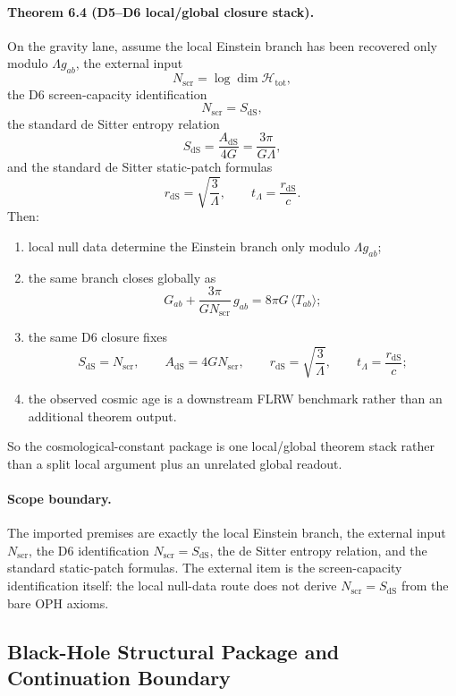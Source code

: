 \paragraph{\textbf{Theorem 6.4 (D5--D6 local/global closure stack).}}
On the gravity lane, assume the local Einstein branch has been recovered only modulo
\(\Lambda g_{ab}\), the external input
\[
N_{\mathrm{scr}}=\log \dim \mathcal H_{\mathrm{tot}},
\]
the D6 screen-capacity identification
\[
N_{\mathrm{scr}}=S_{\mathrm{dS}},
\]
\noindent the standard de Sitter entropy relation
\[
S_{\mathrm{dS}}=\frac{A_{\mathrm{dS}}}{4G}=\frac{3\pi}{G\Lambda},
\]
and the standard de Sitter static-patch formulas
\[
r_{\mathrm{dS}}=\sqrt{\frac{3}{\Lambda}},
\qquad
t_\Lambda=\frac{r_{\mathrm{dS}}}{c}.
\]
Then:
\begin{enumerate}[leftmargin=2em]
\item local null data determine the Einstein branch only modulo \(\Lambda g_{ab}\);
\item the same branch closes globally as
\[
G_{ab}+\frac{3\pi}{G N_{\mathrm{scr}}}\,g_{ab}=8\pi G\,\langle T_{ab}\rangle;
\]
\item the same D6 closure fixes
\[
S_{\mathrm{dS}}=N_{\mathrm{scr}},
\qquad
A_{\mathrm{dS}}=4G N_{\mathrm{scr}},
\qquad
r_{\mathrm{dS}}=\sqrt{\frac{3}{\Lambda}},
\qquad
t_\Lambda=\frac{r_{\mathrm{dS}}}{c};
\]
\item the observed cosmic age is a downstream FLRW benchmark rather than an additional theorem output.
\end{enumerate}
So the cosmological-constant package is one local/global theorem stack rather than a split local
argument plus an unrelated global readout.

\paragraph{\textbf{Scope boundary.}}
The imported premises are exactly the local Einstein branch, the external input
\(N_{\mathrm{scr}}\), the D6 identification \(N_{\mathrm{scr}}=S_{\mathrm{dS}}\), the de Sitter
entropy relation, and the standard static-patch formulas. The external item is the
screen-capacity identification itself: the local null-data route does not derive
\(N_{\mathrm{scr}}=S_{\mathrm{dS}}\) from the bare OPH axioms.

\subsection{Black-Hole Structural Package and Continuation Boundary}

